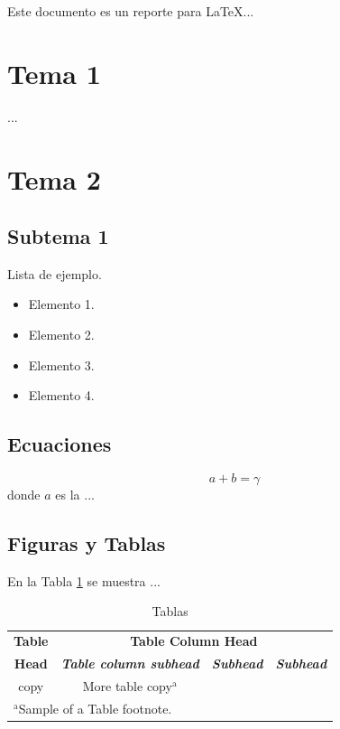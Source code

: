 \documentclass[conference]{IEEEtran}
\begin{document}
   Este documento es un reporte para \LaTeX...

\section{Tema 1}

...

\section{Tema 2}

\subsection{Subtema 1}

   Lista de ejemplo.

\begin{itemize}
\item Elemento 1.
\item Elemento 2.
\item Elemento 3.
\item Elemento 4.
\end{itemize}

\subsection{Ecuaciones}

\begin{equation}
 a+b=\gamma
 \label{ecuacion: efecto cuerpo}
\end{equation}
donde $a$ es la ...

\subsection{Figuras y Tablas}

   En la Tabla \ref{tabla: ejemplo 1} se muestra ...

\begin{table}
\caption{Tablas}
\begin{center}
\begin{tabular}{cccc}
\hline
\textbf{Table}&\multicolumn{3}{c}{\textbf{Table Column Head}} \\
\cline{2-4} 
\textbf{Head} & \textbf{\textit{Table column subhead}}& \textbf{\textit{Subhead}}& \textbf{\textit{Subhead}} \\
\hline
copy& More table copy$^{\mathrm{a}}$& &  \\
\hline
\multicolumn{4}{l}{$^{\mathrm{a}}$Sample of a Table footnote.}
\end{tabular}
\label{tabla: ejemplo 1}
\end{center}
\end{table}
\end{document}
